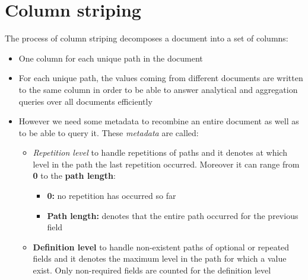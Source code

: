\section{Column striping}
The process of column striping decomposes a document into a set of columns:
\begin{itemize}
    \item One column for each unique path in the document
    \item For each unique path, the values coming from different documents are written to the same column in order to be able to answer analytical and aggregation queries over all documents efficiently
    \item  However we need some metadata to recombine an entire document as well as to be able to query it. These \textit{metadata} are called:
    \begin{itemize}
        \item \textit{Repetition level} to handle repetitions of paths and it denotes at which level in the path the last repetition occurred. Moreover it can range from \textbf{0} to the \textbf{path length}:
        \begin{itemize}
            \item \textbf{0:} no repetition has occurred so far
            \item \textbf{Path length:} denotes that the entire path occurred for the previous field
        \end{itemize}
        \item \textbf{Definition level} to handle non-existent paths of optional or repeated fields and it denotes the maximum level in the path for which a value exist. Only non-required fields are counted for the definition level
    \end{itemize}
\end{itemize}